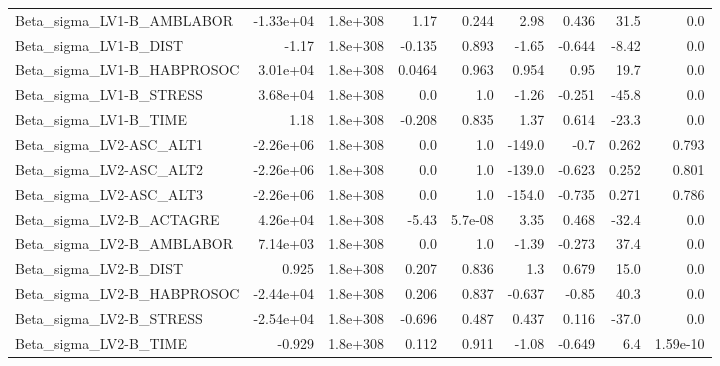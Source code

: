 \begin{tabular}{lrrrrrrrr}
Beta\_sigma\_LV1-B\_AMBLABOR         &   -1.33e+04 &     1.8e+308 &     1.17 &    0.244 &       2.98 &       0.436 &         31.5 &           0.0 \\
Beta\_sigma\_LV1-B\_DIST             &       -1.17 &     1.8e+308 &   -0.135 &    0.893 &      -1.65 &      -0.644 &        -8.42 &           0.0 \\
Beta\_sigma\_LV1-B\_HABPROSOC        &    3.01e+04 &     1.8e+308 &   0.0464 &    0.963 &      0.954 &        0.95 &         19.7 &           0.0 \\
Beta\_sigma\_LV1-B\_STRESS           &    3.68e+04 &     1.8e+308 &      0.0 &      1.0 &      -1.26 &      -0.251 &        -45.8 &           0.0 \\
Beta\_sigma\_LV1-B\_TIME             &        1.18 &     1.8e+308 &   -0.208 &    0.835 &       1.37 &       0.614 &        -23.3 &           0.0 \\
Beta\_sigma\_LV2-ASC\_ALT1           &   -2.26e+06 &     1.8e+308 &      0.0 &      1.0 &     -149.0 &        -0.7 &        0.262 &         0.793 \\
Beta\_sigma\_LV2-ASC\_ALT2           &   -2.26e+06 &     1.8e+308 &      0.0 &      1.0 &     -139.0 &      -0.623 &        0.252 &         0.801 \\
Beta\_sigma\_LV2-ASC\_ALT3           &   -2.26e+06 &     1.8e+308 &      0.0 &      1.0 &     -154.0 &      -0.735 &        0.271 &         0.786 \\
Beta\_sigma\_LV2-B\_ACTAGRE          &    4.26e+04 &     1.8e+308 &    -5.43 &  5.7e-08 &       3.35 &       0.468 &        -32.4 &           0.0 \\
Beta\_sigma\_LV2-B\_AMBLABOR         &    7.14e+03 &     1.8e+308 &      0.0 &      1.0 &      -1.39 &      -0.273 &         37.4 &           0.0 \\
Beta\_sigma\_LV2-B\_DIST             &       0.925 &     1.8e+308 &    0.207 &    0.836 &        1.3 &       0.679 &         15.0 &           0.0 \\
Beta\_sigma\_LV2-B\_HABPROSOC        &   -2.44e+04 &     1.8e+308 &    0.206 &    0.837 &     -0.637 &       -0.85 &         40.3 &           0.0 \\
Beta\_sigma\_LV2-B\_STRESS           &   -2.54e+04 &     1.8e+308 &   -0.696 &    0.487 &      0.437 &       0.116 &        -37.0 &           0.0 \\
Beta\_sigma\_LV2-B\_TIME             &      -0.929 &     1.8e+308 &    0.112 &    0.911 &      -1.08 &      -0.649 &          6.4 &      1.59e-10 \\

\end{tabular}
